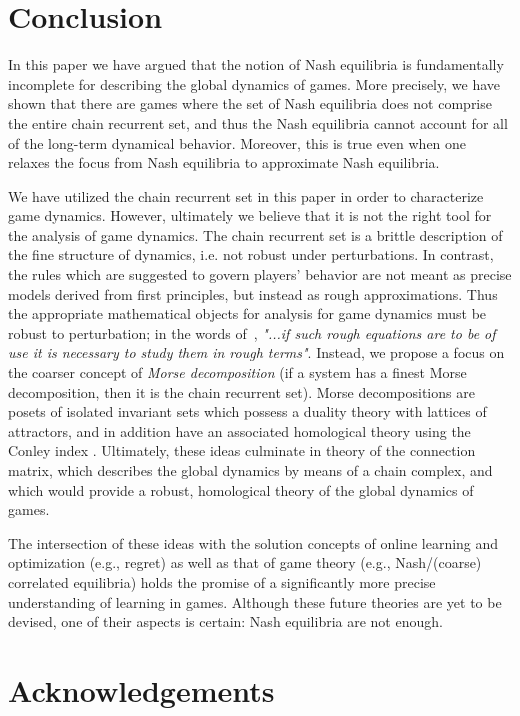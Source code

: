 \documentclass[11pt]{article}
\begin{document}
\section{Conclusion}

In this paper we have argued that the notion of Nash equilibria is fundamentally incomplete for describing the global dynamics of games.  More precisely, we have shown that there are games where the set of Nash equilibria does not comprise the entire chain recurrent set, and thus the Nash equilibria cannot account for all of the long-term dynamical behavior.  Moreover, this is true even when one relaxes the focus from Nash equilibria to approximate Nash equilibria.


We have utilized the chain recurrent set in this paper in order to characterize game dynamics. However, ultimately we believe that it is not the right tool for the analysis of game dynamics.  The chain recurrent set is a brittle description of the fine structure of dynamics, i.e. not robust under perturbations.  In contrast, the rules which are suggested to govern players' behavior are not meant as precise models derived from first principles, but instead as rough approximations.  Thus the appropriate mathematical objects for analysis for game dynamics must be robust to perturbation; in the words of~\citep{conley1978isolated}, \emph{"...if such rough equations are to be of use it is necessary to study them in rough terms"}. 
Instead, we propose a focus on the coarser concept of \emph{Morse decomposition} (if a system has a finest Morse decomposition, then it is the chain recurrent set).  Morse decompositions are posets of isolated invariant sets which possess a duality theory with lattices of attractors, and in addition have an associated homological theory using the Conley index \citep{conley1978isolated}. Ultimately, these ideas culminate in theory of the connection matrix, which describes the global dynamics by means of a chain complex, and which would provide a robust, homological theory of the global dynamics of games.

The intersection of these ideas with the solution concepts of online learning and optimization (e.g., regret) as well as that of game theory (e.g., Nash/(coarse) correlated equilibria) holds the promise of a significantly more precise understanding of learning in games. 
Although these future theories are yet to be devised, one of their aspects is certain: Nash equilibria are not enough.



\section*{Acknowledgements} 
\end{document}
